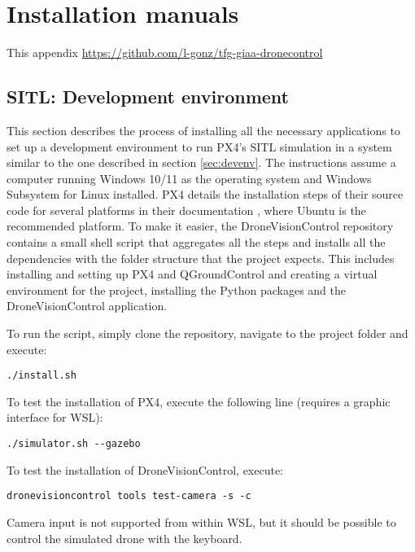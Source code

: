 \chapter{Installation manuals}

This appendix 
\url{https://github.com/l-gonz/tfg-giaa-dronecontrol}

\section{SITL: Development environment}
\label{app:install-dev-env}

This section describes the process of installing all the necessary applications to set up a development environment to run PX4's SITL simulation in a system similar to the one described in section \ref{sec:devenv}.
The instructions assume a computer running Windows 10/11 as the operating system and Windows Subsystem for Linux installed.
PX4 details the installation steps of their source code for several platforms in their documentation \cite{install-px4}, where Ubuntu is the recommended platform.
To make it easier, the DroneVisionControl repository contains a small shell script that aggregates all the steps and installs all the dependencies with the folder structure that the project expects.
This includes installing and setting up PX4 and QGroundControl and creating a virtual environment for the project, installing the Python packages and the DroneVisionControl application.

To run the script, simply clone the repository, navigate to the project folder and execute:
\begin{verbatim}
./install.sh
\end{verbatim}

To test the installation of PX4, execute the following line (requires a graphic interface for WSL):
\begin{verbatim}
./simulator.sh --gazebo
\end{verbatim}

To test the installation of DroneVisionControl, execute:
\begin{verbatim}
dronevisioncontrol tools test-camera -s -c
\end{verbatim}
Camera input is not supported from within WSL, but it should be possible to control the simulated drone with the keyboard.

